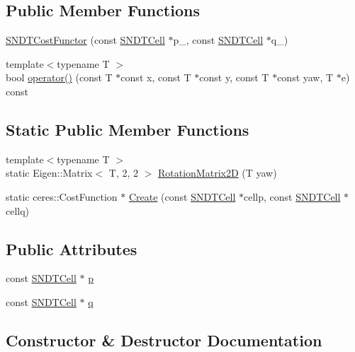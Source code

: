 \subsection*{Public Member Functions}
\begin{DoxyCompactItemize}
\item 
\hyperlink{structSNDTCostFunctor_aad83537dc2e4a90d2a5c74f59c5d50e0}{S\+N\+D\+T\+Cost\+Functor} (const \hyperlink{classSNDTCell}{S\+N\+D\+T\+Cell} $\ast$p\+\_\+, const \hyperlink{classSNDTCell}{S\+N\+D\+T\+Cell} $\ast$q\+\_\+)
\item 
{\footnotesize template$<$typename T $>$ }\\bool \hyperlink{structSNDTCostFunctor_aa90d5ea666b39220dc48e0474172268b}{operator()} (const T $\ast$const x, const T $\ast$const y, const T $\ast$const yaw, T $\ast$e) const
\end{DoxyCompactItemize}
\subsection*{Static Public Member Functions}
\begin{DoxyCompactItemize}
\item 
{\footnotesize template$<$typename T $>$ }\\static Eigen\+::\+Matrix$<$ T, 2, 2 $>$ \hyperlink{structSNDTCostFunctor_ac3ec5d55425287082f5ce7f1788715c7}{Rotation\+Matrix2D} (T yaw)
\item 
static ceres\+::\+Cost\+Function $\ast$ \hyperlink{structSNDTCostFunctor_a22ee42d8807a659af32c15d144ed0c6b}{Create} (const \hyperlink{classSNDTCell}{S\+N\+D\+T\+Cell} $\ast$cellp, const \hyperlink{classSNDTCell}{S\+N\+D\+T\+Cell} $\ast$cellq)
\end{DoxyCompactItemize}
\subsection*{Public Attributes}
\begin{DoxyCompactItemize}
\item 
const \hyperlink{classSNDTCell}{S\+N\+D\+T\+Cell} $\ast$ \hyperlink{structSNDTCostFunctor_ac9abfd289124b6b30105e89266c062a0}{p}
\item 
const \hyperlink{classSNDTCell}{S\+N\+D\+T\+Cell} $\ast$ \hyperlink{structSNDTCostFunctor_a2e02683aa3af214e6d8bb7ca40b9f0b3}{q}
\end{DoxyCompactItemize}


\subsection{Constructor \& Destructor Documentation}
\mbox{\label{structSNDTCostFunctor_aad83537dc2e4a90d2a5c74f59c5d50e0}} 
